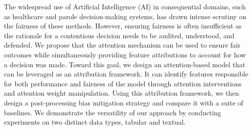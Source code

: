 
The widespread use of Artificial Intelligence (AI) in consequential domains, such as healthcare and parole decision-making systems, has drawn intense scrutiny on the fairness of these methods. However, ensuring fairness is often insufficient as the rationale for a contentious decision needs to be audited, understood, and defended. We propose that the attention mechanism can be used to ensure fair outcomes while simultaneously providing feature attributions to account for how a decision was made. Toward this goal, we design an attention-based model that can be leveraged as an attribution framework. It can identify features responsible for both performance and fairness of the model through attention interventions and attention weight manipulation. Using this attribution framework, we then design a post-processing bias mitigation strategy and compare it with a suite of baselines. We demonstrate the versatility of our approach by conducting experiments on two distinct data types, tabular and textual.
